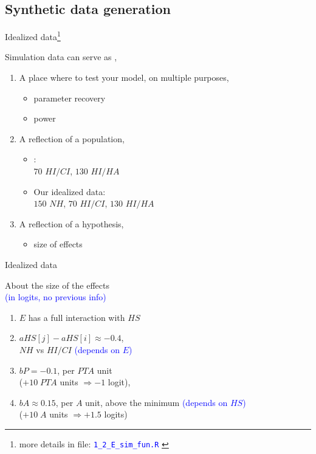 \subsection{Synthetic data generation}
%
%
\begin{frame}[t, negative]
	\subsectionpage
\end{frame}
%
%
\begin{lhframe}[rhgraphic={\texttt{[image: sim\_code1.png]}}]
	{Idealized data\footnote{more details in file: \textcolor{blue}{\texttt{1\_2\_E\_sim\_fun.R} }}}
	
	Simulation data can serve as \cite{Kruschke_2014, McElreath_2020},
	\begin{enumerate}
		\item A place where to test your model, on multiple purposes,
		\begin{itemize}
			\item parameter recovery
			\item power
		\end{itemize}
		\item A reflection of a population, 
		\begin{itemize}
			\item \citet{DeRaeve_2016}: \\
			$70$ $HI/CI$, $130$ $HI/HA$
			\item Our idealized data: \\
			$150$ $NH$, $70$ $HI/CI$, $130$ $HI/HA$
		\end{itemize}
		\item A reflection of a hypothesis,
		\begin{itemize}
			\item size of effects
		\end{itemize}
	\end{enumerate}
\end{lhframe}
%
%
\begin{lhframe}[rhgraphic={\texttt{[image: sim\_code1.png]}}]
	{Idealized data}
	
	About the size of the effects \\
	{\small \textcolor{blue}{(in logits, no previous info)} }
	\begin{enumerate}
		\item $E$ has a full interaction with $HS$ 
		\item $aHS[j] - aHS[i] \approx -0.4$, \\
		$NH$ vs $HI/CI$ \textcolor{blue}{(depends on $E$)}
		\item $bP=-0.1$, per $PTA$ unit \\
		($+10 \; PTA$ units $\Rightarrow -1$ logit),
		\item $bA \approx 0.15$, per $A$ unit, above the minimum \textcolor{blue}{(depends on $HS$)}\\
		($+10 \; A$ units $\Rightarrow +1.5$ logits)
	\end{enumerate}
\end{lhframe}
